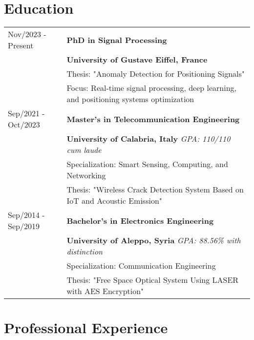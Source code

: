 \documentclass[a4paper,12pt]{article}
\begin{document}
\section{Education}
\begin{tabularx}{\linewidth}{@{}l X@{}}	

Nov/2023 - Present & \textbf{PhD in Signal Processing} \\
& \textbf{University of Gustave Eiffel, France} \\
& Thesis: "Anomaly Detection for Positioning Signals" \\
& Focus: Real-time signal processing, deep learning, and positioning systems optimization \\

Sep/2021 - Oct/2023 & \textbf{Master's in Telecommunication Engineering} \\
& \textbf{University of Calabria, Italy} \hfill \textit{GPA: 110/110 cum laude} \\
& Specialization: Smart Sensing, Computing, and Networking \\
& Thesis: "Wireless Crack Detection System Based on IoT and Acoustic Emission" \\

Sep/2014 - Sep/2019 & \textbf{Bachelor's in Electronics Engineering} \\
& \textbf{University of Aleppo, Syria} \hfill \textit{GPA: 88.56\% with distinction} \\
& Specialization: Communication Engineering \\
& Thesis: "Free Space Optical System Using LASER with AES Encryption" \\
\end{tabularx}


\section{Professional Experience}
\end{document}
